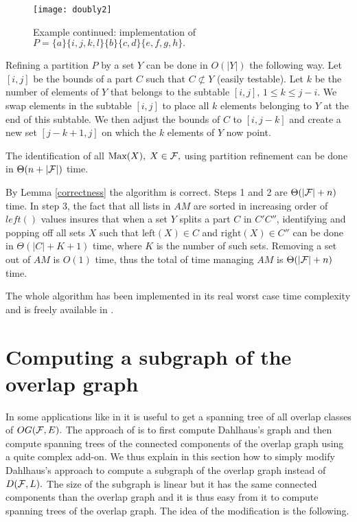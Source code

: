 \documentclass{llncs}
\begin{document}
\begin{figure}[htb]
\centering \texttt{[image: doubly2]}
\caption{Example continued: implementation of
$P=\{a\}\{i,j,k,l\}\{b\}\{c,d\}\{e,f,g,h\}.$}
 \label{lcapic2}
\end{figure}

\noindent 
Refining a partition $P$ by a set $Y$ can be done in $O(|Y|)$ the
following way. Let $[i,j]$ be the bounds of a part $C$ such that $C
\not\subset Y$ (easily testable). Let $k$ be the number of elements of
$Y$ that belongs to the subtable $[i,j]$, $ 1 \leq k \leq j-i$. We
swap elements in the subtable $[i,j]$ to place all $k$ elements
belonging to $Y$ at the end of this subtable. We then adjust the
bounds of $C$ to $[i,j-k]$ and create a new set $[j-k+1,j]$ on which
the $k$ elements of $Y$ now point.

\begin{theorem}
The identification of all $\mbox{Max}(X), \; X \in {\cal F},$ using
partition refinement can be done in $\Theta(n+|{\cal F}|)$ time. 
\end{theorem}
\begin{preuve}
By Lemma \ref{correctness} the algorithm is correct. Steps 1 and 2 are
$\Theta(|{\cal F}|+n)$ time. In step 3, the fact that all lists in
$AM$ are sorted in increasing order of $left()$ values insures that
when a set $Y$ splits a part $C$ in $C'C''$, identifying and popping
off all sets $X$ such that $\mbox{left}(X) \in C$ and $\mbox{right}(X)
\in C''$ can be done in $\Theta(|C|+K+1)$ time, where $K$ is the number
of such sets. Removing a set out of $AM$ is $O(1)$ time, thus the
total of time managing $AM$ is $\Theta(|{\cal F}|+n)$ time.
\end{preuve}

The whole algorithm has been implemented in its real worst case time
complexity and is freely available in \cite{OurImpl07}.

\section{Computing a subgraph of the overlap graph}

In some applications like in \cite{McConnell04} it is useful to get a
spanning tree of all overlap classes of $OG({\cal F},E).$ The approach
of \cite{McConnell04} is to first compute Dahlhaus's graph and then
compute spanning trees of the connected components of the overlap
graph using a quite complex add-on. We thus explain in this section
how to simply modify Dahlhaus's approach to compute a subgraph of the
overlap graph instead of $D({\cal F},L).$ The size of the subgraph is
linear but it has the same connected components than the overlap graph
and it is thus easy from it to compute spanning trees of the overlap
graph. The idea of the modification is the following.
\end{document}
